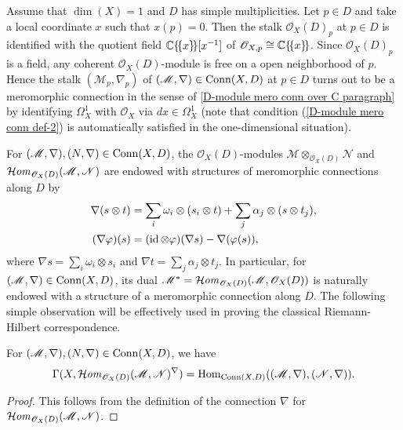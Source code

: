 \begin{remark}
Assume that $\dim(X)=1$ and $D$ has simple multiplicities. Let $p\in D$ and take a local coordinate $x$ such that $x(p)=0$. Then the stalk $\mathscr{O}_X(D)_p$ at $p\in D$ is identified with the quotient field $\mathbb{C}\{\!\{x\}\!\}[x^{-1}]$ of $\mathscr{O}_{X,p}\cong\mathbb{C}\{\!\{x\}\!\}$. Since $\mathscr{O}_{X}(D)_p$ is a field, any coherent $\mathscr{O}_X(D)$-module is free on a open neighborhood of $p$. Hence the stalk $(\mathscr{M}_p,\nabla_p)$ of $(\mathscr{M},\nabla)\in\mathrm{Conn}(X,D)$ at $p\in D$ turns out to be a meromorphic connection in the sense of \ref{D-module mero conn over C paragraph} by identifying $\Omega_X^1$ with $\mathscr{O}_X$ via $dx\in\Omega_X^1$ (note that condition (\ref{D-module mero conn def-2}) is automatically satisfied in the one-dimensional situation).
\end{remark}

For $(\mathscr{M},\nabla),(N,\nabla)\in\mathrm{Conn}(X,D)$, the $\mathscr{O}_X(D)$-modules $\mathscr{M}\otimes_{\mathscr{O}_X(D)}\mathscr{N}$ and $\operatorname{\mathcal{H}\hspace*{-0.4pt}\textit{om}\hspace{0.5pt}}_{\mathscr{O}_X(D)}(\mathscr{M},\mathscr{N})$ are endowed with structures of meromorphic connections along $D$ by
\begin{align*}
\nabla(s\otimes t)&=\sum_i\omega_i\otimes(s_i\otimes t)+\sum_j\alpha_j\otimes(s\otimes t_j),\\
(\nabla\varphi)(s)&=(\operatorname{id}\otimes\varphi)(\nabla s)-\nabla(\varphi(s)),
\end{align*}
where $\nabla s=\sum_i\omega_i\otimes s_i$ and $\nabla t=\sum_j\alpha_j\otimes t_j$. In particular, for $(\mathscr{M},\nabla)\in\mathrm{Conn}(X,D)$, its dual $\mathscr{M}^*=\operatorname{\mathcal{H}\hspace*{-0.4pt}\textit{om}\hspace{0.5pt}}_{\mathscr{O}_X(D)}(\mathscr{M},\mathscr{O}_X(D))$ is naturally endowed with a structure of a meromorphic connection along $D$. The following simple observation will be effectively used in proving the classical Riemann-Hilbert correspondence.

\begin{lemma}\label{D-module mero conn horizontal of Hom char}
For $(\mathscr{M},\nabla),(N,\nabla)\in\mathrm{Conn}(X,D)$, we have
\[\Gamma(X,\operatorname{\mathcal{H}\hspace*{-0.4pt}\textit{om}\hspace{0.5pt}}_{\mathscr{O}_X(D)}(\mathscr{M},\mathscr{N})^\nabla)=\mathrm{Hom}_{\mathrm{Conn}(X,D)}((\mathscr{M},\nabla),(\mathscr{N},\nabla)).\]
\end{lemma}
\begin{proof}
This follows from the definition of the connection $\nabla$ for $\operatorname{\mathcal{H}\hspace*{-0.4pt}\textit{om}\hspace{0.5pt}}_{\mathscr{O}_X(D)}(\mathscr{M},\mathscr{N})$.
\end{proof}

